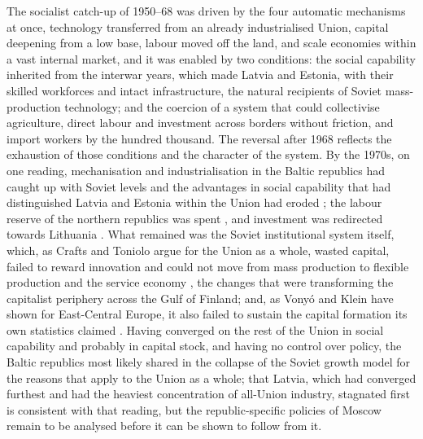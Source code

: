 The socialist catch-up of 1950--68 was driven by the four automatic mechanisms at once, technology transferred from an already industrialised Union, capital deepening from a low base, labour moved off the land, and scale economies within a vast internal market, and it was enabled by two conditions: the social capability inherited from the interwar years, which made Latvia and Estonia, with their skilled workforces and intact infrastructure, the natural recipients of Soviet mass-production technology; and the coercion of a system that could collectivise agriculture, direct labour and investment across borders without friction, and import workers by the hundred thousand. The reversal after 1968 reflects the exhaustion of those conditions and the character of the system. By the 1970s, on one reading, mechanisation and industrialisation in the Baltic republics had caught up with Soviet levels and the advantages in social capability that had distinguished Latvia and Estonia within the Union had eroded \parencite[217]{klimantas2025thesis}; the labour reserve of the northern republics was spent \parencite[236--7]{years_of_dependence}, and investment was redirected towards Lithuania \parencite[492--3]{grybkauskas_2022_economic}. What remained was the Soviet institutional system itself, which, as Crafts and Toniolo argue for the Union as a whole, wasted capital, failed to reward innovation and could not move from mass production to flexible production and the service economy \parencite[314--15, 323]{craftstoniolo2010}, the changes that were transforming the capitalist periphery across the Gulf of Finland; and, as Vonyó and Klein have shown for East-Central Europe, it also failed to sustain the capital formation its own statistics claimed \parencite{vonyo_whydidsocialistfail}. Having converged on the rest of the Union in social capability and probably in capital stock, and having no control over policy, the Baltic republics most likely shared in the collapse of the Soviet growth model for the reasons that apply to the Union as a whole; that Latvia, which had converged furthest and had the heaviest concentration of all-Union industry, stagnated first is consistent with that reading, but the republic-specific policies of Moscow remain to be analysed before it can be shown to follow from it.

